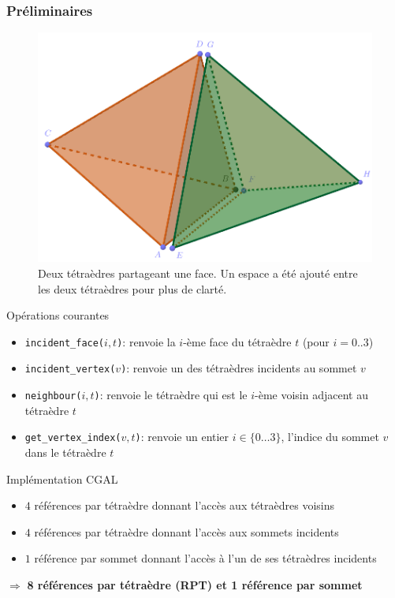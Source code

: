 \documentclass[9pt]{beamer}
\begin{document}
\begin{frame}
\footnotesize
\frametitle{Préliminaires}
\begin{figure}
\includegraphics[scale=0.11]{Images/naive}
\caption{Deux tétraèdres partageant une face. Un espace a été ajouté entre les deux tétraèdres pour plus de clarté.}
\end{figure}
\begin{block}{Opérations courantes}
\begin{itemize}
\item \texttt{incident\_face($i,t$)}: renvoie la $i$-ème face du tétraèdre $t$ (pour $i=0..3$)
\item \texttt{incident\_vertex($v$)}: renvoie un des tétraèdres incidents au sommet $v$
\item \texttt{neighbour($i, t$)}: renvoie le tétraèdre qui est le $i$-ème voisin adjacent au tétraèdre $t$
\item \texttt{get\_vertex\_index($v,t$)}: renvoie un entier $i\in\{0 \ldots 3 \}$, l'indice du sommet $v$ dans le tétraèdre $t$
\end{itemize}
\end{block}

\begin{block}{Implémentation CGAL}
\begin{itemize}
\item $4$ références par tétraèdre donnant l'accès aux tétraèdres voisins
\item $4$ références par tétraèdre donnant l'accès aux sommets incidents
\item $1$ référence par sommet donnant l'accès à l'un de ses tétraèdres incidents
\end{itemize}
$\Rightarrow$ \textbf{8 références par tétraèdre (RPT) et 1 référence par sommet}
\end{block}
\end{frame}
\end{document}
